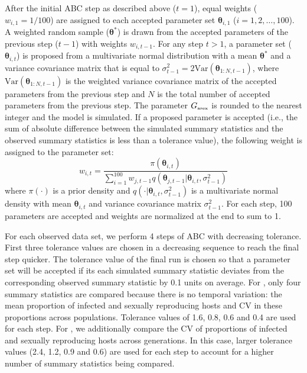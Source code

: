 \documentclass{article}\usepackage[]{graphicx}\usepackage[]{color}
\begin{document}
After the initial ABC step as described above ($t=1$), equal weights ($w_{i,1}=1/100$) are assigned to each accepted parameter set $\bm\theta_{i, 1}$ ($i = 1, 2, \dots, 100$).
A weighted random sample ($\bm\theta^\ast$) is drawn from the accepted parameters of the previous step ($t-1$) with weights $w_{i,t-1}$.
For any step $t > 1$, a parameter set ($\bm\theta_{i, t}$) is proposed from a multivariate normal distribution with a mean $\bm\theta^\ast$ and a variance covariance matrix that is equal to $\sigma_{t-1}^2=2 \mathrm{Var}(\bm\theta_{1:N, t-1})$, where $\mathrm{Var}(\bm\theta_{1:N, t-1})$ is the weighted variance covariance matrix of the accepted parameters from the previous step and $N$ is the total number of accepted parameters from the previous step.
The parameter $G_{\textrm{\tiny asex}}$ is rounded to the nearest integer and the model is simulated.
If a proposed parameter is accepted (i.e., the sum of absolute difference between the simulated summary statistics and the observed summary statistics is less than a tolerance value), the following weight is assigned to the parameter set:
$$
w_{i,t} = \frac{\pi(\bm\theta_{i, t})}{\sum_{i=1}^{100} w_{j, t-1} q(\bm\theta_{j, t-1} | \bm\theta_{i,t}, \sigma_{t-1}^2)}
$$
where $\pi(\cdot)$ is a prior density and $q(\cdot | \bm\theta_{i,t}, \sigma_{t-1}^2)$ is a multivariate normal density with mean $\bm\theta_{i,t}$ and variance covariance matrix $\sigma_{t-1}^2$.
For each step, 100 parameters are accepted and weights are normalized at the end to sum to 1.

For each observed data set, we perform 4 steps of ABC with decreasing tolerance.
First three tolerance values are chosen in a decreasing sequence to reach the final step quicker.
The tolerance value of the final run is chosen so that a parameter set will be accepted if its each simulated summary statistic deviates from the corresponding observed summary statistic by 0.1 units on average.
For \citep{dagan2013clonal, mckone2016fine}, only four summary statistics are compared because there is no temporal variation: the mean proportion of infected and sexually reproducing hosts and CV in these proportions across populations.
Tolerance values of 1.6, 0.8, 0.6 and 0.4 are used for each step.
For \citep{vergara2014infection}, we additionally compare the CV of proportions of infected and sexually reproducing hosts across generations.
In this case, larger tolerance values (2.4, 1.2, 0.9 and 0.6) are used for each step to account for a higher number of summary statistics being compared.
\end{document}
